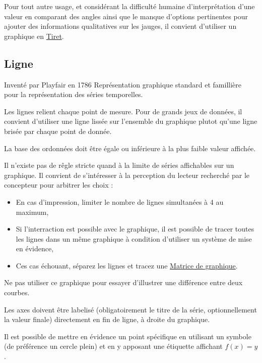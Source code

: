 \documentclass[a4paper,12pt]{article}
\begin{document}
\begin{multicols}{2}
Pour tout autre usage, et considérant la difficulté humaine d'interprétation d'une valeur en comparant des angles ainsi que le manque d'options pertinentes pour ajouter des informations qualitatives sur les jauges, il convient d'utiliser un graphique en \hyperref[sec:orgfd7bd21]{Tiret}.
\subsection*{Ligne}
\label{sec:orgb49a6ce}
Inventé par Playfair en 1786 \autocite{sosulskiBecomingVisual2019}
Représentation graphique standard et famillière pour la représentation des séries temporelles. \autocite[,@Schwabish2021p86]{alansmithLexiqueVisuel}

Les lignes relient chaque point de mesure. Pour de grands jeux de données, il convient d'utiliser une ligne lissée sur l'ensemble du graphique plutot qu'une ligne brisée par chaque point de donnée. \autocite{wilkeDirectoryVisualizations2019}

La base des ordonnées doit être égale ou inférieure à la plus faible valeur affichée. \autocite{Wong2010}

Il n'existe pas de rêgle stricte quand à la limite de séries affichables sur un graphique.\autocite{jonathanschwabishTime2021} Il convient de s'intéresser à la perception du lecteur recherché par le concepteur pour arbitrer les choix : \autocite{jonathanschwabishTime2021}
\begin{itemize}
\item En cas d'impression, limiter le nombre de lignes simultanées à 4 au maximum, \autocite{Wong2010}
\item Si l'interraction est possible avec le graphique, il est possible de tracer toutes les lignes dans un même graphique à condition d'utiliser un système de mise en évidence,\autocite{jonathanschwabishTime2021}
\item Ces cas échouant, séparez les lignes et tracez une \hyperref[sec:org10b09f5]{Matrice de graphique}.
\end{itemize}

Ne pas utiliser ce graphique pour essayer d'illustrer une différence entre deux courbes. \autocite{jonathanschwabishTime2021}

Les axes doivent être labelisé (obligatoirement le titre de la série, optionnellement la valeur finale) directement en fin de ligne, à droite du graphique. \autocite{andreaskrauseBestPracticesData2024,sosulskiGraphics2019}

Il est possible de mettre en évidence un point spécifique en utilisant un symbole (de préférence un cercle plein) et en y apposant une étiquette affichant \(f(x)=y\).


\end{multicols}
\end{document}
